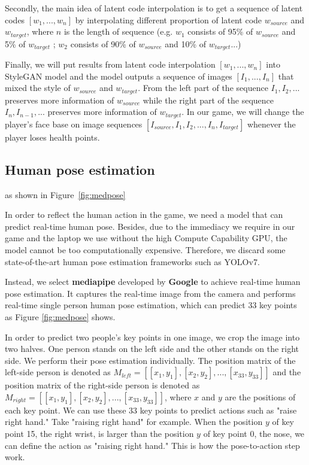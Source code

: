Secondly, the main idea of latent code interpolation is to get a sequence of latent codes $[w_1,...,w_n]$ by interpolating different proportion of latent code $w_{source}$ and $w_{target}$, where $n$ is the length of sequence (e.g. $w_1$ consists of 95\% of $w_{source}$ and 5\% of $w_{target}$ ; $w_2$ consists of 90\% of $w_{source}$ and 10\% of $w_{target}$...)

Finally, we will put results from latent code interpolation $[w_1,...,w_n]$ into StyleGAN model and the model outputs a sequence of images $[I_1,...,I_n]$ that mixed the style of $w_{source}$ and $w_{target}$. From the left part of the sequence $I_1,I_2,...$ preserves more information of $w_{source}$ while the right part of the sequence $I_n,I_{n-1},...$ preserves more information of $w_{target}$. In our game, we will change the player's face base on image sequences $[I_{source},I_1,I_2, ... ,I_n,I_{target}]$ whenever the player loses health points. 

\subsection{Human pose estimation}
as shown in Figure~\ref{fig:medpose}


In order to reflect the human action in the game, we need a model that can predict real-time human pose. Besides, due to the immediacy we require in our game and the laptop we use without the high Compute Capability GPU, the model cannot be too computationally expensive. Therefore, we discard some state-of-the-art human pose estimation frameworks such as YOLOv7\cite{Alpher06}. 

Instead, we select \textbf{mediapipe}\cite{med} developed by \textbf{Google} to achieve real-time human pose estimation. It captures the real-time image from the camera and performs real-time single person human pose estimation, which can predict 33 key points as Figure \ref{fig:medpose} shows.

In order to predict two people's key points in one image, we crop the image into two halves. One person stands on the left side and the other stands on the right side. We perform their pose estimation individually. The position matrix of the left-side person is denoted as $M_{left}=[[x_1, y_1],[x_2, y_2],...,[x_{33}, y_{33}]]$ and the position matrix of the right-side person is denoted as $M_{right}=[[x_1, y_1],[x_2, y_2],...,[x_{33}, y_{33}]]$, where $x$ and $y$ are the positions of each key point. We can use these 33 key points to predict actions such as "raise right hand." Take "raising right hand" for example. When the position $y$ of key point 15, the right wrist, is larger than the position $y$ of key point 0, the nose, we can define the action as "raising right hand." This is how the pose-to-action step work.


